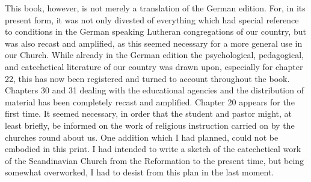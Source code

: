 This book, however, is not merely a translation of the German edition. For, in its present form, it was not only divested of everything which had special reference to conditions
in the German speaking Lutheran congregations of our country, but was also recast and amplified, as this seemed necessary for a more general use in our Church. While already in the German edition the psychological, pedagogical, and catechetical literature of our country was drawn upon, especially for chapter 22, this has now been registered and turned to account throughout the book. Chapters 30 and 31 dealing with the educational agencies and the distribution of material has been completely recast and amplified. Chapter 20 appears for the first time. It seemed necessary, in order that the student and pastor might, at least briefly, be informed on the work of religious instruction carried on by the churches round about us. One addition which I had planned, could not be embodied in this print. I had intended to write a sketch of the catechetical work of the Scandinavian Church from the Reformation to the present time, but being somewhat overworked, I had to desist from this plan in the last moment.

